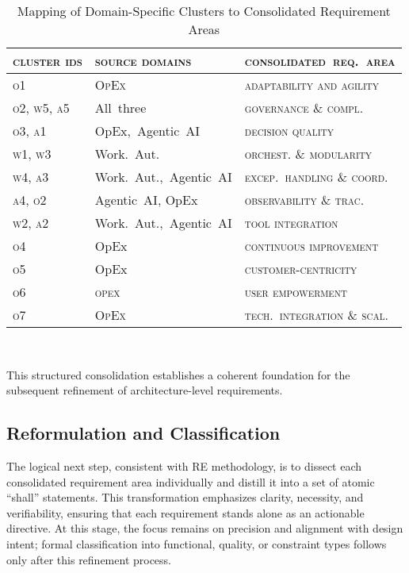 \begin{table}[h!]
  \centering
  \begin{tabular}{p{3cm} p{5cm} p{5.5cm}}
    \toprule
    \textsc{cluster ids} & \textsc{source domains} & \textsc{consolidated~req.~area} \\
    \midrule
    \textsc{o1} & \textsc{OpEx} & \textsc{adaptability and agility} \\
    \textsc{o2, w5, a5} & All~three & \textsc{governance \& compl.} \\
    \textsc{o3, a1} & OpEx,~Agentic~AI & \textsc{decision quality} \\
    \textsc{w1, w3} & Work.~Aut. & \textsc{orchest. \& modularity} \\
    \textsc{w4, a3} & Work.~Aut.,~Agentic~AI & \textsc{excep.~handling \& coord.} \\
    \textsc{a4, o2} & Agentic~AI, OpEx & \textsc{observability \& trac.} \\
    \textsc{w2, a2} & Work.~Aut.,~Agentic~AI & \textsc{tool integration} \\
    \textsc{o4} & OpEx & \textsc{continuous improvement} \\
    \textsc{o5} & OpEx & \textsc{customer-centricity} \\
    \textsc{o6} & \textsc{opex} & \textsc{user empowerment} \\
    \textsc{o7} & \textsc{OpEx}& \textsc{tech.~integration \& scal.} \\
    \bottomrule
  \end{tabular}
  \caption{Mapping of Domain-Specific Clusters to Consolidated Requirement Areas}~\label{tab:req-clustering}
\end{table}

This structured consolidation establishes a coherent foundation for the subsequent refinement of architecture-level requirements.

\subsection{Reformulation and Classification}\label{subsec:req-clas}
The logical next step, consistent with RE methodology, is to dissect each consolidated requirement area individually and distill it into a set of atomic “shall” statements. This transformation emphasizes clarity, necessity, and verifiability, ensuring that each requirement stands alone as an actionable directive. At this stage, the focus remains on precision and alignment with design intent; formal classification into functional, quality, or constraint types follows only after this refinement process.


